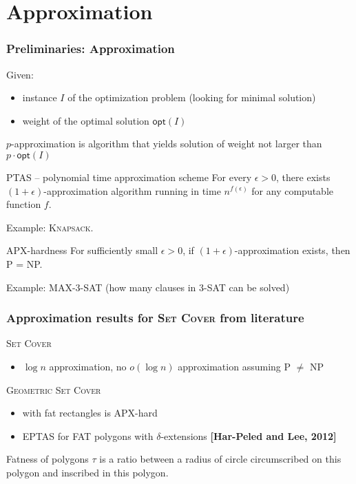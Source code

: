 \documentclass{beamer}
\begin{document}
\section{Approximation}
\begin{frame}
\frametitle{Preliminaries: Approximation}
Given:
\begin{itemize}
\item instance $I$ of the optimization problem (looking for minimal solution)
\item weight of the optimal solution $\mathsf{opt}(I)$
\end{itemize}
$p$-approximation is algorithm that yields solution of weight not larger than
$p\cdot \mathsf{opt}(I)$
\begin{block}{PTAS -- polynomial time approximation scheme}
For every $\epsilon > 0$, there exists $(1+\epsilon)$-approximation
algorithm running in time $n^{f(\epsilon)}$ for any computable function $f$.

Example: \textsc{Knapsack}.

\end{block}

\begin{block}{APX-hardness}
For sufficiently small $\epsilon > 0$,
if $(1+\epsilon)$-approximation exists, then P = NP.

Example: \textsc{MAX-3-SAT} (how many clauses in 3-SAT can be solved)
\end{block}


\end{frame}
\begin{frame}
\frametitle{Approximation results for \textsc{Set Cover} from literature}
\textsc{Set Cover}
\begin{itemize}
\item $\log n$ approximation, no $o(\log n)$ approximation assuming P $\neq$ NP
\end{itemize}

\textsc{Geometric Set Cover}
\begin{itemize}
\item with fat rectangles is APX-hard
\item EPTAS for FAT polygons with $\delta$-extensions \textbf{[Har-Peled and Lee, 2012]}
\end{itemize}


\begin{definition}{
Fatness of polygons $\tau$ is a ratio between a radius of circle
circumscribed on this polygon and inscribed in this polygon.
}\end{definition}


\end{frame}
\end{document}
